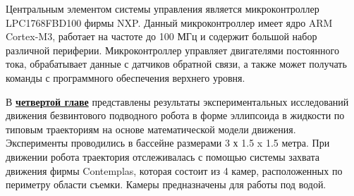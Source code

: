 



%


Центральным элементом системы управления является микроконтроллер LPC1768FBD100 фирмы NXP. Данный микроконтроллер имеет ядро ARM Cortex-M3, работает на частоте до 100 МГц и содержит большой набор различной периферии. Микроконтроллер управляет двигателями постоянного тока, обрабатывает данные с датчиков обратной связи, а также может получать команды с программного обеспечения верхнего уровня.














В \underline{\textbf{четвертой главе}} представлены результаты экспериментальных исследований движения безвинтового подводного робота в форме эллипсоида в жидкости по типовым траекториям на основе математической модели движения. Эксперименты проводились в бассейне размерами 3 х 1.5 x 1.5 метра. При движении робота траектория отслеживалась с помощью системы захвата движения фирмы Contemplas, которая состоит из 4 камер, расположенных по периметру области съемки. Камеры предназначены для работы под водой. 

